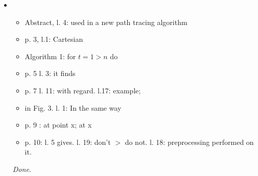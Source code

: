 \documentclass[final,envcountsame]{article}
\begin{document}
\begin{itemize}

\item \begin{itemize}
\item Abstract, l. 4: used in a new path tracing algorithm
\item p. 3, l.1: Cartesian
\item Algorithm 1: for $t=1­­>n$ do
\item p. 5 l. ­3: it finds
\item p. 7 l. 11: with regard. l.17: example; 
\item in Fig. 3. l. ­1: In the same way
\item p. 9 : at point x; at x
\item p. 10: l. 5 gives. l. 19: don't­­ $>$ do not. l. ­18: preprocessing performed on it. 
\end{itemize}

\textit{Done.}\\

\end{itemize}
\end{document}
